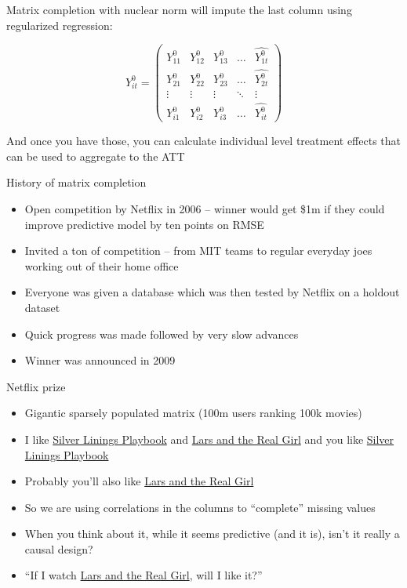 \documentclass{beamer}
\begin{document}
\begin{frame}[plain]

Matrix completion with nuclear norm will impute the last column using regularized regression:

\begin{center}
\[ Y^0_{it}  =\begin{pmatrix}
    Y^0_{11} & Y^0_{12} & Y^0_{13} & \dots  & \widehat{Y^0_{1t}} \\
    Y^0_{21} & Y^0_{22} & Y^0_{23} & \dots  & \widehat{Y^0_{2t}} \\
    \vdots & \vdots & \vdots & \ddots & \vdots \\
    Y^0_{i1} & Y^0_{i2} & Y^0_{i3} & \dots  & \widehat{Y^0_{it}}
\end{pmatrix}\]
\end{center}

And once you have those, you can calculate individual level treatment effects that can be used to aggregate to the ATT

\end{frame}


\begin{frame}{History of matrix completion}

\begin{itemize}
\item Open competition by Netflix in 2006 -- winner would get \$1m if they could improve predictive model by ten points on RMSE
\item Invited a ton of competition -- from MIT teams to regular everyday joes working out of their home office
\item Everyone was given a database which was then tested by Netflix on a holdout dataset
\item Quick progress was made followed by very slow advances
\item Winner was announced in 2009
\end{itemize}

\end{frame}

\begin{frame}{Netflix prize}

\begin{itemize}
\item Gigantic sparsely populated matrix (100m users ranking 100k movies)
\item I like \underline{Silver Linings Playbook} and \underline{Lars and the Real Girl} and you like \underline{Silver Linings Playbook}
\item Probably you'll also like \underline {Lars and the Real Girl}
\item So we are using correlations in the columns to ``complete'' missing values
\item When you think about it, while it seems predictive (and it is), isn't it really a causal design?
\item ``If I watch \underline{Lars and the Real Girl}, will I like it?''
\end{itemize}

\end{frame}
\end{document}
